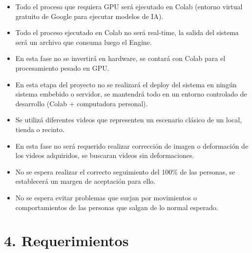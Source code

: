 \documentclass[11pt]{charter}
\begin{document}
\begin{itemize}
\item Todo el proceso que requiera GPU será ejecutado en Colab (entorno virtual gratuito de Google para ejecutar modelos de IA).
\item Todo el proceso ejecutado en Colab no será real-time, la salida del sistema será un archivo que consuma luego el Engine.
\item En esta fase no se invertirá en hardware, se contará con Colab para el procesamiento pesado en GPU.
\item En esta etapa del proyecto no se realizará el deploy del sistema en ningún sistema embebido o servidor, se mantendrá todo en un entorno controlado de desarrollo (Colab + computadora personal).
\item Se utilizá diferentes videos que representen un escenario clásico de un local, tienda o recinto.
\item En esta fase no será requerido realizar corrección de imagen o deformación de los videos adquiridos, se buscaran videos sin deformaciones.
\item No se espera realizar el correcto seguimiento del 100\% de las personas, se establecerá un margen de aceptación para ello.
\item No se espera evitar problemas que surjan por movimientos o comportamientos de las personas que salgan de lo normal esperado.
\end{itemize}

\newpage

\section{4. Requerimientos}
\label{sec:requerimientos}
\end{document}
